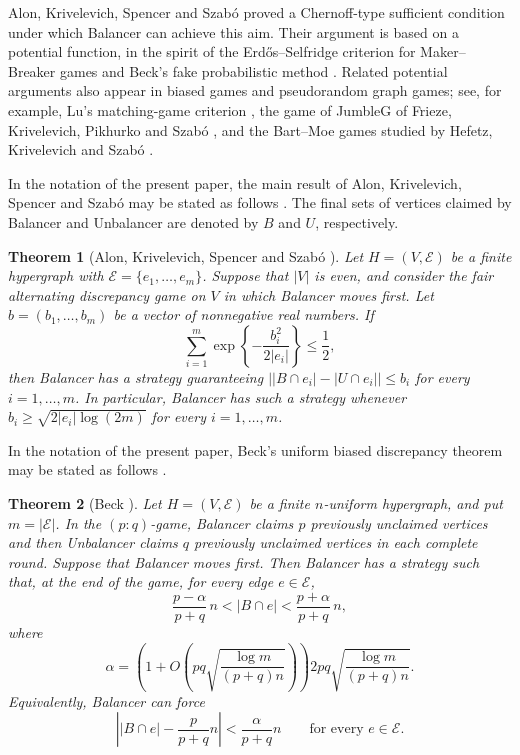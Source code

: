 \documentclass[twoside,12pt]{article}
\numberwithin{equation}{section}
\newtheorem{theorem}{Theorem}[section]
\begin{document}
Alon, Krivelevich, Spencer and Szab\'o \cite{AKSS} proved a Chernoff-type sufficient condition under which Balancer can achieve this aim.  Their argument is based on a potential function, in the spirit of the Erd\H{o}s--Selfridge criterion for Maker--Breaker games \cite{ErdosSelfridge} and Beck's fake probabilistic method \cite{Beck81,Beck}.  Related potential arguments also appear in biased games and pseudorandom graph games; see, for example, Lu's matching-game criterion \cite{Lu}, the game of JumbleG of Frieze, Krivelevich, Pikhurko and Szab\'o \cite{FKPS}, and the Bart--Moe games studied by Hefetz, Krivelevich and Szab\'o \cite{HKS}.

In the notation of the present paper, the main result of Alon,
Krivelevich, Spencer and Szab\'o may be stated as follows
\cite[Theorem~1]{AKSS}.
The final sets of vertices claimed by Balancer and Unbalancer are denoted by $B$ and $U$, respectively.
\begin{theorem}[Alon,
Krivelevich, Spencer and Szab\'o  \cite{AKSS}]\label{thm:AKSS}
Let $H=(V,\mathcal E)$ be a finite hypergraph with
$\mathcal E=\{e_1,\ldots,e_m\}$.
Suppose that $|V|$ is even, and consider the fair alternating discrepancy
game on $V$ in which Balancer moves first.  Let
$b=(b_1,\ldots,b_m)$
be a vector of nonnegative real numbers.  If
\[
        \sum_{i=1}^m
        \exp\!\left\{-\frac{b_i^2}{2|e_i|}\right\}
        \le \frac12,
\]
then Balancer has a strategy guaranteeing
$\bigl||B\cap e_i|-|U\cap e_i|\bigr|\le b_i$
for every $i=1,\ldots,m$.
In particular, Balancer has such a strategy whenever
$b_i\ge \sqrt{2|e_i|\log(2m)}$
for every $i=1,\ldots,m$.
\end{theorem}




In the notation of the present paper, Beck's uniform biased discrepancy
theorem may be stated as follows \cite[Theorem~17.5]{Beck}.

\begin{theorem}[Beck \cite{Beck}]\label{thm:beck-uniform}
Let $H=(V,\mathcal E)$ be a finite $n$-uniform hypergraph, and put
$m=|\mathcal E|$. In the $(p:q)$-game, Balancer claims $p$ previously
unclaimed vertices and then Unbalancer claims $q$ previously unclaimed
vertices in each complete round.  Suppose that Balancer moves first.
Then Balancer has a strategy such that, at the end of the game, for every
edge $e\in\mathcal E$,
\[
        \frac{p-\alpha}{p+q}\,n
        <
        |B\cap e|
        <
        \frac{p+\alpha}{p+q}\,n,
\]
where
\[
        \alpha
        =
        \left(
        1+
        O\!\left(
        pq\sqrt{\frac{\log m}{(p+q)n}}
        \right)
        \right)
        2pq
        \sqrt{\frac{\log m}{(p+q)n}} .
\]
Equivalently, Balancer can force
\[
        \left|
        |B\cap e|-\frac{p}{p+q}n
        \right|
        <
        \frac{\alpha}{p+q}n
        \qquad\text{for every }e\in\mathcal E .
\]
\end{theorem}
\end{document}
